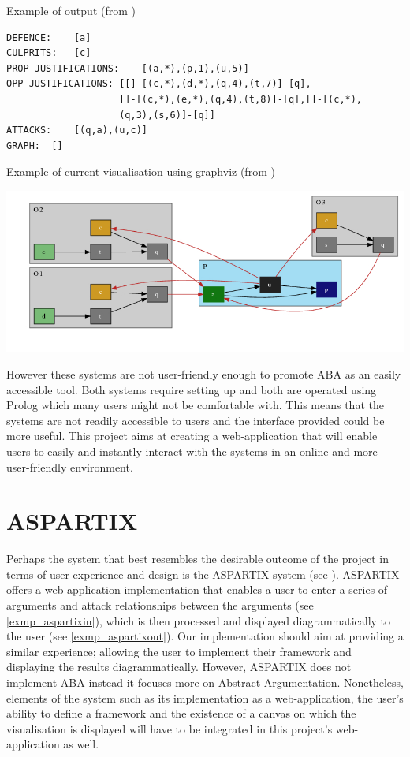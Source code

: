 \begin{exmp} Example of output (from \cite{graphargsys}) \label{exmp_graph}
\begin{verbatim}
DEFENCE:	[a]
CULPRITS:	[c]
PROP JUSTIFICATIONS:	[(a,*),(p,1),(u,5)]
OPP JUSTIFICATIONS:	[[]-[(c,*),(d,*),(q,4),(t,7)]-[q],
					[]-[(c,*),(e,*),(q,4),(t,8)]-[q],[]-[(c,*),
					(q,3),(s,6)]-[q]]
ATTACKS:	[(q,a),(u,c)]
GRAPH:	[]
\end{verbatim}

\end{exmp}

\begin{exmp} Example of current visualisation using graphviz (from \cite{graphargsys}) \label{exmp_graphimg}

\includegraphics[width=\linewidth]{graphviz}

\end{exmp}

However these systems are not user-friendly enough to promote ABA as an easily accessible tool. Both systems require setting up and both are operated using Prolog which many users might not be comfortable with. This means that the systems are not readily accessible to users and the interface provided could be more useful. This project aims at creating a web-application that will enable users to easily and instantly interact with the systems in an online and more user-friendly environment.

\section{ASPARTIX}
Perhaps the system that best resembles the desirable outcome of the project in terms of user experience and design is the ASPARTIX system (see \cite{aspartix}). ASPARTIX offers a web-application implementation that enables a user to enter a series of arguments and attack relationships between the arguments (see \cref{exmp_aspartixin}), which is then processed and displayed diagrammatically to the user (see \cref{exmp_aspartixout}).  Our implementation should aim at providing a similar experience; allowing the user to implement their framework and displaying the results diagrammatically. However, ASPARTIX does not implement ABA instead it focuses more on Abstract Argumentation. Nonetheless, elements of the system such as its implementation as a web-application, the user's ability to define a framework and the existence of a canvas on which the visualisation is displayed will have to be integrated in this project's web-application as well.

